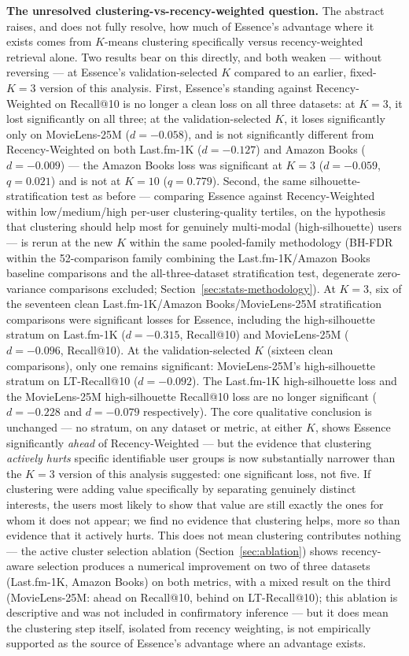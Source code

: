 \documentclass[11pt,a4paper]{article}
\begin{document}
\textbf{The unresolved clustering-vs-recency-weighted question.} The
abstract raises, and does not fully resolve, how much of Essence's
advantage where it exists comes from $K$-means clustering specifically
versus recency-weighted retrieval alone. Two results bear on this
directly, and both weaken --- without reversing --- at Essence's
validation-selected $K$ compared to an earlier, fixed-$K=3$ version of
this analysis. First, Essence's standing against Recency-Weighted on
Recall@10 is no longer a clean loss on all three datasets: at $K=3$, it
lost significantly on all three; at the validation-selected $K$, it loses
significantly only on MovieLens-25M ($d=-0.058$), and is not
significantly different from Recency-Weighted on both Last.fm-1K
($d=-0.127$) and Amazon Books ($d=-0.009$) --- the Amazon Books loss was
significant at $K=3$ ($d=-0.059$, $q=0.021$) and is not at $K=10$
($q=0.779$). Second, the same silhouette-stratification test as before ---
comparing Essence against Recency-Weighted within low/medium/high
per-user clustering-quality tertiles, on the hypothesis that clustering
should help most for genuinely multi-modal (high-silhouette) users --- is
rerun at the new $K$ within the same pooled-family methodology
(BH-FDR within the 52-comparison family combining the Last.fm-1K/Amazon
Books baseline comparisons and the all-three-dataset stratification test,
degenerate zero-variance comparisons excluded; Section~\ref{sec:stats-methodology}).
At $K=3$, six of the seventeen clean Last.fm-1K/Amazon Books/MovieLens-25M
stratification comparisons were significant losses for Essence, including
the high-silhouette stratum on Last.fm-1K ($d=-0.315$, Recall@10) and
MovieLens-25M ($d=-0.096$, Recall@10). At the validation-selected $K$
(sixteen clean comparisons), only one remains significant: MovieLens-25M's
high-silhouette stratum on LT-Recall@10 ($d=-0.092$). The Last.fm-1K high-silhouette loss
and the MovieLens-25M high-silhouette Recall@10 loss are no longer
significant ($d=-0.228$ and $d=-0.079$ respectively). The core qualitative
conclusion is unchanged --- no stratum, on any dataset or metric, at
either $K$, shows Essence significantly \emph{ahead} of Recency-Weighted
--- but the evidence that clustering \emph{actively hurts} specific
identifiable user groups is now substantially narrower than the $K=3$
version of this analysis suggested: one significant loss, not five. If
clustering were adding value specifically by separating genuinely distinct
interests, the users most likely to show that value are still exactly the
ones for whom it does not appear; we find no evidence that clustering
helps, more so than evidence that it actively hurts. This does not mean clustering
contributes nothing --- the active cluster selection ablation
(Section~\ref{sec:ablation}) shows recency-aware selection produces a
numerical improvement on two of three datasets (Last.fm-1K, Amazon
Books) on both metrics, with a mixed result on the third
(MovieLens-25M: ahead on Recall@10, behind on LT-Recall@10); this
ablation is descriptive and was not included in confirmatory inference
--- but it does mean the clustering step itself, isolated from recency weighting,
is not empirically supported as the source of Essence's advantage where an
advantage exists.
\end{document}
